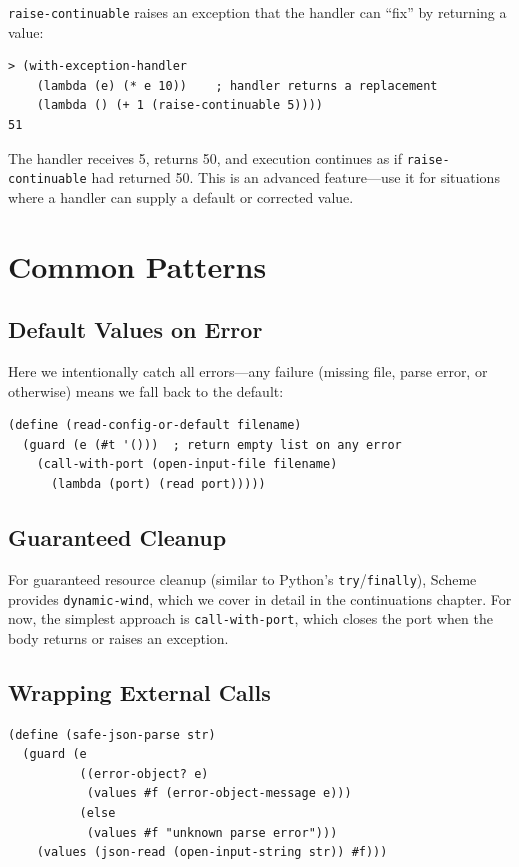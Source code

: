\texttt{raise-continuable} raises an exception that the handler can ``fix'' by returning a value:

\begin{lstlisting}[style=repl]
> (with-exception-handler
    (lambda (e) (* e 10))    ; handler returns a replacement
    (lambda () (+ 1 (raise-continuable 5))))
51
\end{lstlisting}

The handler receives 5, returns 50, and execution continues as if \texttt{raise-continuable} had returned 50. This is an advanced feature---use it for situations where a handler can supply a default or corrected value.

\section{Common Patterns}

\subsection{Default Values on Error}

Here we intentionally catch all errors---any failure (missing file, parse error, or otherwise) means we fall back to the default:

\begin{lstlisting}
(define (read-config-or-default filename)
  (guard (e (#t '()))  ; return empty list on any error
    (call-with-port (open-input-file filename)
      (lambda (port) (read port)))))
\end{lstlisting}

\subsection{Guaranteed Cleanup}

For guaranteed resource cleanup (similar to Python's \texttt{try}/\texttt{finally}), Scheme provides \texttt{dynamic-wind}, which we cover in detail in the continuations chapter. For now, the simplest approach is \texttt{call-with-port}, which closes the port when the body returns or raises an exception.

\subsection{Wrapping External Calls}

\begin{lstlisting}
(define (safe-json-parse str)
  (guard (e
          ((error-object? e)
           (values #f (error-object-message e)))
          (else
           (values #f "unknown parse error")))
    (values (json-read (open-input-string str)) #f)))
\end{lstlisting}

